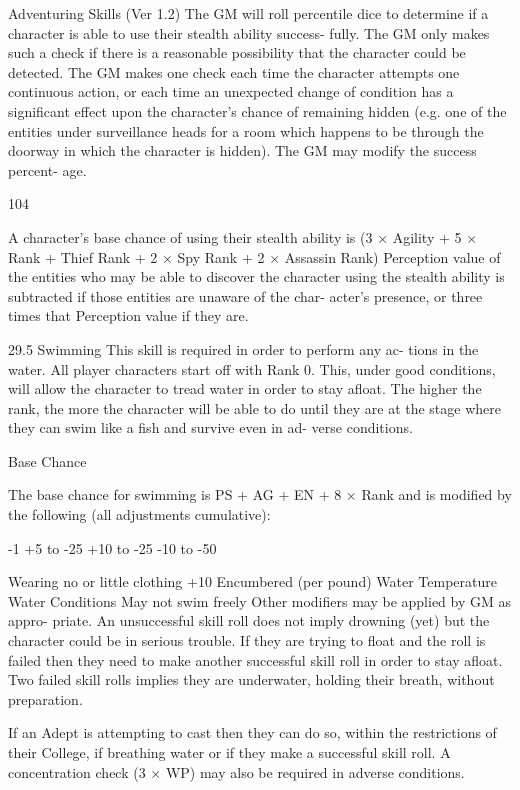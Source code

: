 \begin{Chapter}{Adventuring Skills (Ver 1.2)}
The  GM  will  roll  percentile  dice  to  determine  if  a 
character is able to use their stealth ability success-
fully. The GM only makes such a check if there is 
a reasonable possibility that the character could be 
detected.  The  GM  makes  one  check each  time  the 
character  attempts  one  continuous  action,  or  each 
time  an  unexpected  change  of  condition  has  a 
significant  effect  upon  the  character’s  chance  of 
remaining  hidden  (e.g.  one  of  the  entities  under 
surveillance heads for a room which happens to be 
through  the  doorway  in  which  the  character  is 
hidden). The GM may modify the success percent-
age. 

104 

A  character’s  base  chance  of  using  their  stealth 
ability is (3 × Agility + 5 × Rank + Thief Rank + 2 
×  Spy  Rank  + 2  ×  Assassin Rank)%
Perception value of the entities who may be able to 
discover  the  character  using  the  stealth  ability  is 
subtracted if those entities are unaware of the char-
acter’s  presence,  or  three  times  that  Perception 
value if they are. 

29.5 Swimming 
This  skill  is  required  in  order  to  perform  any  ac-
tions  in  the  water.  All  player  characters  start  off 
with  Rank  0.  This,  under  good  conditions,  will 
allow  the  character  to  tread  water  in  order  to  stay 
afloat. The higher the rank, the more the character 
will be able to do until they are at the stage where 
they  can  swim  like  a  fish  and  survive  even  in  ad-
verse conditions. 

Base Chance 

The base chance for swimming is PS + AG + EN + 
8  ×  Rank  and  is  modified  by  the  following  (all 
adjustments cumulative): 

-1 
+5 to -25 
+10 to -25 
-10 to -50 

Wearing no or little clothing  +10 
Encumbered (per pound) 
Water Temperature 
Water Conditions 
May not swim freely 
Other  modifiers  may  be  applied  by  GM  as  appro-
priate.  An  unsuccessful  skill  roll  does  not  imply 
drowning (yet) but the character could be in serious 
trouble.  If  they  are  trying  to  float  and  the  roll  is 
failed  then  they  need  to  make  another  successful 
skill  roll  in  order  to  stay  afloat.  Two  failed  skill 
rolls  implies  they  are  underwater,  holding  their 
breath, without preparation. 

If  an  Adept  is  attempting  to  cast  then  they  can  do 
so,  within  the  restrictions  of  their  College,  if 
breathing  water  or  if  they  make  a  successful  skill 
roll.  A concentration check (3 × WP) may also be 
required in adverse conditions. 


\end{Chapter}

